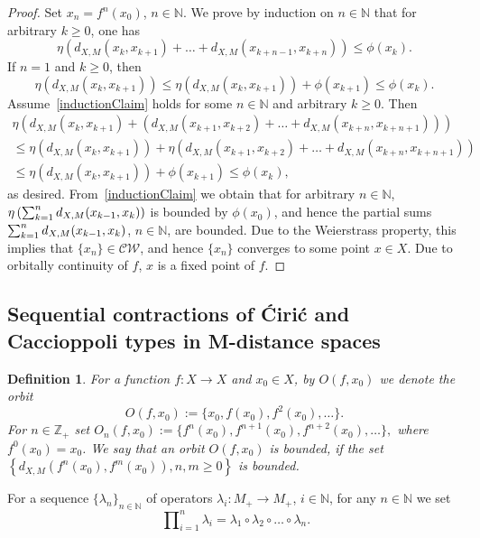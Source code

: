 \documentclass[12pt]{amsart}          %
\newtheorem{definition}{Definition}
\newcommand{\NN}{\mathbb N}
\newcommand{\ZZ}{\mathbb Z}
\begin{document}
\begin{proof}
Set $x_n = f^n(x_0)$, $n\in\NN$. We prove by induction on $n\in\NN$ that for arbitrary $k\geq 0$, one has
\begin{equation}\label{inductionClaim}
\eta(d_{X,M}(x_k, x_{k+1}) + \ldots + d_{X,M}(x_{k+n-1}, x_{k+n}))\leq \phi(x_k).
\end{equation}
If $n = 1$ and $k\geq 0$, then
$$
\eta(d_{X,M} (x_k, x_{k+1}))
  \leq 
\eta(d_{X,M}(x_k, x_{k+1})) + \phi(x_{k+1})
\leq 
\phi(x_k).
$$
Assume~\eqref{inductionClaim} holds for some $n\in\NN$ and arbitrary $k\geq 0$. Then
\begin{gather*}
\eta(d_{X,M}(x_k, x_{k+1}) +  (d_{X,M}(x_{k+1}, x_{k+2}) + \ldots + d_{X,M}(x_{k+n}, x_{k+n+ 1})))
\\ \leq 
\eta(d_{X,M}(x_k, x_{k+1})) + \eta (d_{X,M}(x_{k+1}, x_{k+2}) + \ldots + d_{X,M}(x_{k+n}, x_{k+n+ 1}))
 \\\leq 
\eta(d_{X,M}(x_k, x_{k+1})) +  \phi(x_{k+1})
\leq 
\phi(x_k),
\end{gather*}
as desired. From~\eqref{inductionClaim} we obtain that for arbitrary $n\in\NN$, $\eta\left(\sum\nolimits\nolimits_{k=1}^n d_{X,M}(x_{k-1}, x_{k})\right)$ is bounded by $\phi(x_0)$, and hence the partial sums $\sum\nolimits\nolimits_{k=1}^n d_{X,M}(x_{k-1}, x_{k})$, $n\in\NN$, are bounded. Due to the Weierstrass property, this implies that $\{x_n\}\in \mathcal{CW}$, and hence  $\{x_n\}$ converges to some point $x\in X$. Due to orbitally continuity of $f$, $x$ is a fixed point of $f$.
\end{proof}

\subsection{ Sequential contractions of \'Ciri\'c and Caccioppoli types in M-distance spaces}\label{s::sequentialContractions}




\begin{definition}
For a function $f\colon X\to X$ and $x_0\in X$, by $O(f,x_0)$ we denote the orbit
$$
O(f,x_0):=\{x_0,f(x_0), f^2(x_0),\ldots\}.
$$
For $n\in \ZZ_+$ set
$
O_n(f,x_0):=\{f^n(x_0),f^{n+1}(x_0), f^{n+2}(x_0),\ldots\},
$
where $f^0(x_0) = x_0$.
We say that an orbit $O(f,x_0)$ is bounded, if the set $\left\{d_{X,M}(f^n(x_0), f^m(x_0)),n,m\geq 0\right\}$ is bounded.
\end{definition}


For a sequence $\{ \lambda_n\}_{n\in \NN}$  of  operators $\lambda_i\colon M_+\to M_+$, $i\in\NN$, for any $n\in\NN$  we set
$$\
\prod\nolimits_{i=1}^n\lambda_i=\lambda_1\circ \lambda_2\circ\ldots\circ\lambda_n.
$$ 
\end{document}
